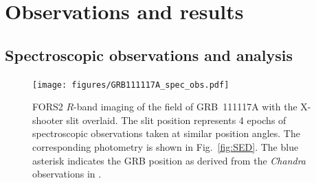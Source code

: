 \documentclass{aa}    %
\begin{document}

\section{Observations and results}

\subsection{Spectroscopic observations and analysis}

\begin{figure}
	\centering
	\texttt{[image: figures/GRB111117A\_spec\_obs.pdf]}
	\caption{
	FORS2 $R$-band imaging of the field of GRB~111117A with the X-shooter slit
overlaid. The slit position represents 4 epochs of spectroscopic observations
taken at similar position angles. The corresponding photometry is shown in
Fig.~\ref{fig:SED}. The blue asterisk indicates the GRB position as derived
from the \emph{Chandra} observations in \citet{Sakamoto2013}.
	}
	\label{fig:spec_setup}
\end{figure}

\end{document}
